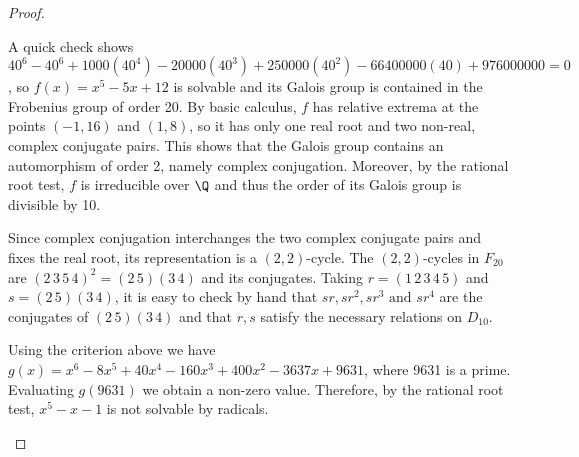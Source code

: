 \documentclass[10pt]{amsart}
\begin{document}
\begin{thm}
  \label{Ex2}
  \begin{proof}
    \begin{alphaenum}
    \item
      A quick check shows $40^6 - 40^6 + 1000(40^4) - 20000(40^3) + 250000(40^2) - 66400000(40) + 976000000 = 0$, so $f(x) = x^5 - 5x + 12$ is solvable and its Galois group is contained in the Frobenius group of order 20.
      By basic calculus, $f$ has relative extrema at the points $(-1,16)$ and $(1,8)$, so it has only one real root and two non-real, complex conjugate pairs.
      This shows that the Galois group contains an automorphism of order 2, namely complex conjugation.
      Moreover, by the rational root test, $f$ is irreducible over $\Q$ and thus the order of its Galois group is divisible by 10.
      
      Since complex conjugation interchanges the two complex conjugate pairs and fixes the real root, its representation is a $(2,2)$-cycle.
      The $(2,2)$-cycles in $F_{20}$ are $(2\,3\,5\,4)^2 = (2\,5)(3\,4)$ and its conjugates.
      Taking $r = (1\,2\,3\,4\,5)$ and $s = (2\,5)(3\,4)$, it is easy to check by hand that $sr, sr^2, sr^3 \text{ and } sr^4$ are the conjugates of $(2\,5)(3\,4)$ and that $r,s$ satisfy the necessary relations on $D_{10}$.
    \item
      Using the criterion above we have $g(x) = x^6 - 8x^5 + 40x^4 - 160x^3 + 400x^2 - 3637x + 9631$, where 9631 is a prime.
      Evaluating $g(9631)$ we obtain a non-zero value.
      Therefore, by the rational root test, $x^5 - x - 1$ is not solvable by radicals.
    \end{alphaenum}
  \end{proof}
\end{thm}
\end{document}
